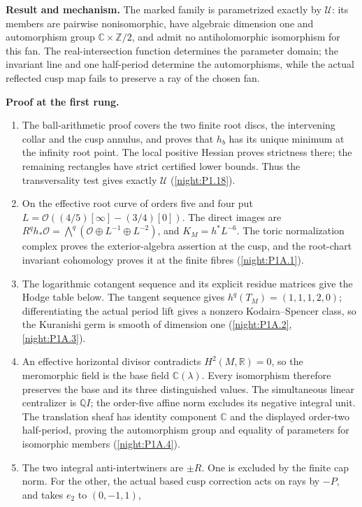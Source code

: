 \documentclass[11pt,a4paper]{article}
\theoremstyle{definition}
\newcommand{\RungZero}[1]{\par\noindent\textbf{Result and mechanism.} #1\par\smallskip}
\newcommand{\RungOne}{\par\Needspace{6\baselineskip}\noindent\textbf{Proof at the first rung.}\par\nobreak\smallskip}
\begin{document}
\RungZero{The marked family is parametrized exactly by $\mathcal U$:
its members are pairwise nonisomorphic, have algebraic dimension one
and automorphism group $\mathbb C\times\mathbb Z/2$, and admit no
antiholomorphic isomorphism for this fan.  The real-intersection
function determines the parameter domain; the invariant line and
one half-period determine the automorphisms, while the actual
reflected cusp map fails to preserve a ray of the chosen fan.}
\RungOne
\begin{enumerate}[label=\arabic*.]
\item The ball-arithmetic proof covers the two finite root discs,
  the intervening collar and the cusp annulus, and proves that $h_b$
  has its unique minimum at the infinity root point.  The local
  positive Hessian proves strictness there; the remaining rectangles
  have strict certified lower bounds.  Thus the transversality test
  gives exactly $\mathcal U$ (\cref{night:P1.18}).
\item On the effective root curve of orders five and four put
  $L=\mathcal O((4/5)[\infty]-(3/4)[0])$.  The direct images are
  $R^qh_*\mathcal O=\bigwedge^q
  (\mathcal O\oplus L^{-1}\oplus L^{-2})$, and
  $K_M=h^*L^{-6}$.  The toric normalization complex proves the
  exterior-algebra assertion at the cusp, and the root-chart
  invariant cohomology proves it at the finite fibres
  (\cref{night:P1A.1}).
\item The logarithmic cotangent sequence and its explicit residue
  matrices give the Hodge table below.  The tangent sequence gives
  $h^q(T_M)=(1,1,1,2,0)$; differentiating the actual period lift
  gives a nonzero Kodaira--Spencer class, so the Kuranishi germ is
  smooth of dimension one (\cref{night:P1A.2}, \cref{night:P1A.3}).
\item An effective horizontal divisor contradicts $H^2(M,\mathbb R)=0$,
  so the meromorphic field is the base field $\mathbb C(\lambda)$.
  Every isomorphism therefore preserves the base and its three
  distinguished values.  The simultaneous linear centralizer is
  $\mathbb Q I$; the order-five affine norm excludes its negative
  integral unit.  The translation sheaf has identity component
  $\mathbb C$ and the displayed order-two half-period, proving the
  automorphism group and equality of parameters for isomorphic
  members (\cref{night:P1A.4}).
\item The two integral anti-intertwiners are $\pm R$.  One is excluded
  by the finite cap norm.  For the other, the actual based cusp
  correction acts on rays by $-P$, and takes $e_2$ to $(0,-1,1)$,

\end{enumerate}
\end{document}
